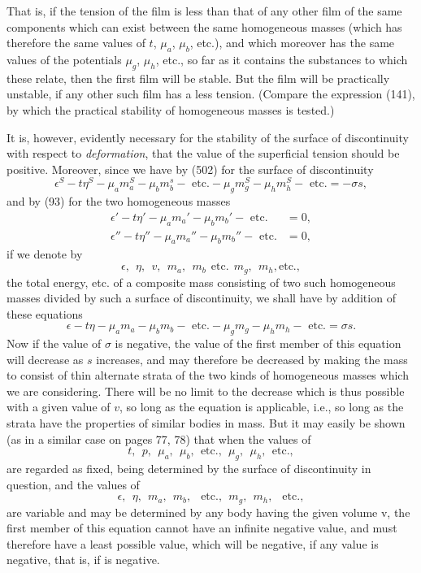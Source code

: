 \documentclass[12pt]{article}
\begin{document}
{That is, if the tension of the film is less than that of any other film of the same components which can exist between the same homogeneous masses (which has therefore the same values of $t$, $\mu_a$, $\mu_b$, etc.), and which moreover has the same values of the potentials $\mu_g$, $\mu_h$, etc., so far as it contains the substances to which these relate, then the first film will be stable. But the film will be practically unstable, if any other such film has a less tension. (Compare the expression (141), by which the practical stability of homogeneous masses is tested.)

It is, however, evidently necessary for the stability of the surface of discontinuity with respect to \textit{deformation}, that the value of the superficial tension should be positive. Moreover, since we have by (502) for the surface of discontinuity
$$ \epsilon^S-t\eta^S - \mu_a m_a^S -\mu_b m_b^s - \text{ etc.} - \mu_g m_g^S - \mu_h m_h^S - \text{ etc.} = -\sigma s, $$
and by (93) for the two homogeneous masses
\begin{align*}
\epsilon'-t\eta' - \mu_a m_a' -\mu_b m_b' - \text{ etc.} &=0, \\
\epsilon''-t\eta'' - \mu_a m_a'' -\mu_b m_b'' - \text{ etc.} &= 0, \end{align*}
if we denote by
$$ \epsilon, \ \ \eta, \ \ v, \ \ m_a, \ \  m_b \ \ \text{etc.} \ \ m_g, \ \  m_h, \text{etc.}, $$
the total energy, etc. of a composite mass consisting of two such homogeneous masses divided by such a surface of discontinuity, we shall have by addition of these equations
$$ \epsilon-t\eta - \mu_a m_a -\mu_b m_b - \text{ etc.} - \mu_g m_g - \mu_h m_h - \text{ etc.} = \sigma s.$$
Now if the value of $\sigma$ is negative, the value of the first member of this equation will decrease as $s$ increases, and may therefore be decreased by making the mass to consist of thin alternate strata of the two kinds of homogeneous masses which we are considering. There will be no limit to the decrease which is thus possible with a given value of $v$, so long as the equation is applicable, i.e., so long as the strata have the properties of similar bodies in mass. But it may easily be shown (as in a similar case on pages 77, 78) that when the values of
$$ t, \ \  p, \ \ \mu_a, \ \ \mu_b, \ \ \text{etc.}, \ \ \mu_g, \ \  \mu_h, \ \ \text{etc.}, $$
are regarded as fixed, being determined by the surface of discontinuity in question, and the values of
$$ \epsilon, \ \ \eta, \ \ m_a, \ \ m_b,\ \ \text{ etc.}, \ \ m_g,\ \  m_h,\ \  \text{ etc.},$$
are variable and may be determined by any body having the given volume v, the first member of this equation cannot have an infinite negative value, and must therefore have a least possible value, which will be negative, if any value is negative, that is, if  is negative.


}
\end{document}
